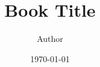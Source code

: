 \usepackage{lipsum}
\usepackage{pgfplots}

\title{Book Title}
\author{Author}
\date{\today}
\def\publisher{Publisher}
\def\publisherlogo{jr_press.png}
\def\bookedition{First}
\def\coverimage{}
\def\backcoverimage{}
\def\heightunit{'}
